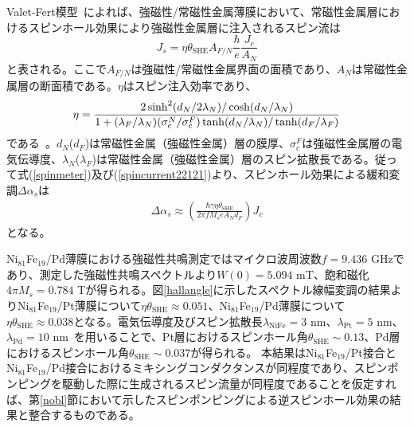 Valet-Fert模型~\cite{Valet,Maekawa}によれば、強磁性/常磁性金属薄膜において、常磁性金属層におけるスピンホール効果により強磁性金属層に注入されるスピン流は
\begin{equation}
J_s=\eta\theta_\text{SHE}A_{F/N}\frac{\hbar}{e}\frac{{J_c}}{A_N}\label{spincurrent22121}
\end{equation}
と表される。ここで$A_{F/N}$は強磁性/常磁性金属界面の面積であり、$A_N$は常磁性金属層の断面積である。$\eta $はスピン注入効率であり、
\begin{equation}
\eta  = \frac{{2\sinh ^2 (d_{N} /2\lambda _{N} ){\rm{/}}\cosh (d_{N} /\lambda _{N} )}}{{1 + (\lambda _{F} {\rm{/}}\lambda _{N} )(\sigma _{\rm{c}}^{N} {\rm{/}}\sigma _{\rm{c}}^{F} )\tanh (d_{N} {\rm{/}}\lambda _{N} )/\tanh (d_{F} {\rm{/}}\lambda _{F} )}}
\end{equation}
である~\cite{AndoPRL}。$d_N$($d_F$)は常磁性金属（強磁性金属）層の膜厚、$\sigma^F_c$は強磁性金属層の電気伝導度、$\lambda_N$($\lambda_F$)は常磁性金属（強磁性金属）層のスピン拡散長である。従って式(\ref{spinmeter})及び(\ref{spincurrent22121})より、スピンホール効果による緩和変調$\Delta \alpha_s$は
\begin{eqnarray}
  \Delta\alpha_s
   \approx
  \left( 
    \frac{\hbar\gamma\eta\theta_\text{SHE}}{2\pi f M_s e A_N d_F} 
  \right)
   J_c
   \label{eq:Dalpha}				
\end{eqnarray}					
となる。



Ni$_{81}$Fe$_{19}$/Pd薄膜における強磁性共鳴測定ではマイクロ波周波数$f=9.436$ GHzであり、測定した強磁性共鳴スペクトルより$W(0)=5.094$ mT、飽和磁化$4\pi M_s=0.784$ Tが得られる。図\ref{hallangle}に示したスペクトル線幅変調の結果よりNi$_{81}$Fe$_{19}$/Pt薄膜について$\eta \theta_\text{SHE}\approx 0.051$、Ni$_{81}$Fe$_{19}$/Pd薄膜について$\eta \theta_\text{SHE}\approx 0.038$となる。電気伝導度及びスピン拡散長$\lambda_\text{NiFe}=3$ nm、$\lambda_\text{Pt}=5$ nm、$\lambda_\text{Pd}=10$ nm~\cite{Bass}を用いることで、Pt層におけるスピンホール角$\theta_\text{SHE} \sim 0.13$、Pd層におけるスピンホール角$\theta_\text{SHE} \sim 0.037$が得られる。
本結果はNi$_{81}$Fe$_{19}$/Pt接合とNi$_{81}$Fe$_{19}$/Pd接合におけるミキシングコンダクタンスが同程度であり、スピンポンピングを駆動した際に生成されるスピン流量が同程度であることを仮定すれば、第\ref{nobl}節において示したスピンポンピングによる逆スピンホール効果の結果と整合するものである。






